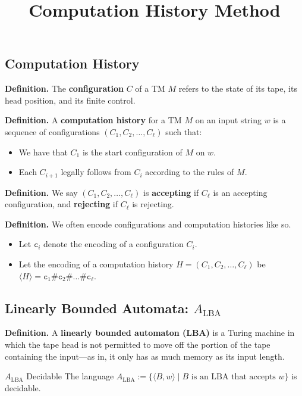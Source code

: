 \title{Computation History Method}



\subsection{Computation History}

\textbf{Definition.}
The \textbf{configuration} $C$ of a TM $M$
refers to the state of its tape, its head position, and its finite control.

\textbf{Definition.}
A \textbf{computation history} for a TM $M$ on an input string $w$ is
a sequence of configurations $(C_1, C_2, \dots, C_{\ell})$ such that:
\begin{itemize}
    \item We have that $C_1$ is the start configuration of $M$ on $w$.
    \item Each $C_{i + 1}$ legally follows from $C_i$
    according to the rules of $M$.
\end{itemize}

\textbf{Definition.}
We say $(C_1, C_2, \dots, C_{\ell})$ is \textbf{accepting}
if $C_{\ell}$ is an accepting configuration, and \textbf{rejecting}
if $C_{\ell}$ is rejecting.

\textbf{Definition.}
We often encode configurations and computation histories
like so.
\begin{itemize}
    \item Let $\texttt{c}_i$ denote
    the encoding of a configuration $C_i$.
    \item Let the encoding of a computation history
    $H = (C_1, C_2, \dots, C_{\ell})$ be
    $\langle H \rangle =
    \texttt{c}_1 \texttt{\#}
    \texttt{c}_2 \texttt{\#}
    \dots
    \texttt{\#} \texttt{c}_{\ell}$.
\end{itemize}

\subsection{Linearly Bounded Automata:
$A_{\mathrm{LBA}}$}

\textbf{Definition.}
A \textbf{linearly bounded automaton (LBA)} is a Turing machine
in which the tape head is not permitted to move
off the portion of the tape containing the input---as in,
it only has as much memory as its input length.

\begin{theorem}{$A_{\mathrm{LBA}}$ Decidable}
    The language $A_{\mathrm{LBA}} := \{
        \langle B, w \rangle \mid
        B \text{ is an LBA that accepts } w
    \}$ is decidable.
\end{theorem}

